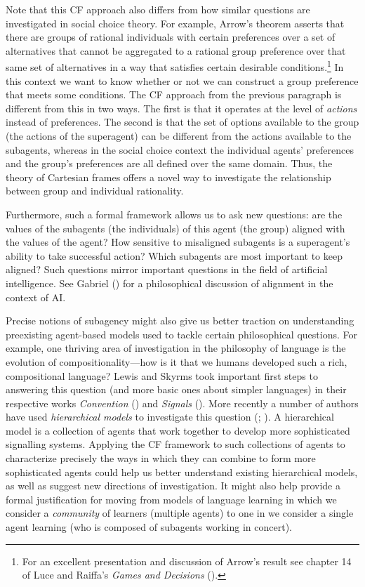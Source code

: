 \documentclass{article}
\begin{document}
Note that this CF approach also differs from how similar questions are investigated in social choice theory. For example, Arrow's theorem asserts that there are groups of rational individuals with certain preferences over a set of alternatives that cannot be aggregated to a rational group preference over that same set of alternatives in a way that satisfies certain desirable conditions.\footnote{For an excellent presentation and discussion of Arrow's result see chapter 14 of Luce and Raiffa's \textit{Games and Decisions} (\citeyear{luce1989games}).} In this context we want to know whether or not we can construct a group preference that meets some conditions. The CF approach from the previous paragraph is different from this in two ways. The first is that it operates at the level of \textit{actions} instead of preferences. The second is that the set of options available to the group (the actions of the superagent) can be different from the actions available to the subagents, whereas in the social choice context the individual agents' preferences and the group's preferences are all defined over the same domain. Thus, the theory of Cartesian frames offers a novel way to investigate the relationship between group and individual rationality. 

Furthermore, such a formal framework allows us to ask new questions: are the values of the subagents (the individuals) of this agent (the group) aligned with the values of the agent? How sensitive to misaligned subagents is a superagent's ability to take successful action? Which subagents are most important to keep aligned? Such questions mirror important questions in the field of artificial intelligence. See Gabriel (\citeyear{gabriel2020artificial}) for a philosophical discussion of alignment in the context of AI. 

Precise notions of subagency might also give us better traction on understanding preexisting agent-based models used to tackle certain philosophical questions. For example, one thriving area of investigation in the philosophy of language is the evolution of compositionality---how is it that we humans developed such a rich, compositional language? Lewis and Skyrms took important first steps to answering this question (and more basic ones about simpler languages) in their respective works \textit{Convention} (\citeyear{lewis2008convention}) and \textit{Signals} (\citeyear{skyrms2010signals}). More recently a number of authors have used \textit{hierarchical models} to investigate this question (\cite{barrett2018hierarchical}; \cite{barrett2020evolution}). A hierarchical model is a collection of agents that work together to develop more sophisticated signalling systems. Applying the CF framework to such collections of agents to characterize precisely the ways in which they can combine to form more sophisticated agents could help us better understand existing hierarchical models, as well as suggest new directions of investigation. It might also help provide a formal justification for moving from models of language learning in which we consider a \textit{community} of learners (multiple agents) to one in we consider a single agent learning (who is composed of subagents working in concert). 
\end{document}
